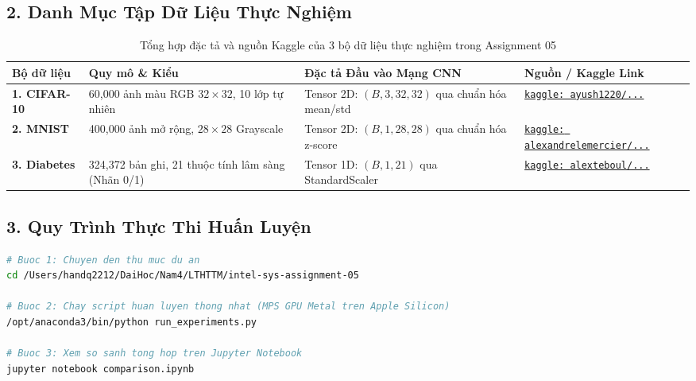 \documentclass[12pt,a4paper]{article}
\begin{document}
\subsection*{2. Danh Mục Tập Dữ Liệu Thực Nghiệm}
\begin{table}[htbp]
\centering
\small
\begin{tabularx}{\textwidth}{l L{3.2cm} X L{4.2cm}}
\toprule
\textbf{Bộ dữ liệu} & \textbf{Quy mô \& Kiểu} & \textbf{Đặc tả Đầu vào Mạng CNN} & \textbf{Nguồn / Kaggle Link} \\
\midrule
\textbf{1. CIFAR-10} & 60,000 ảnh màu RGB $32 \times 32$, 10 lớp tự nhiên & Tensor 2D: $(B, 3, 32, 32)$ qua chuẩn hóa mean/std & \href{https://www.kaggle.com/datasets/ayush1220/cifar10}{\texttt{kaggle: ayush1220/...}} \cite{data_cifar10} \\
\addlinespace
\textbf{2. MNIST} & 400,000 ảnh mở rộng, $28 \times 28$ Grayscale & Tensor 2D: $(B, 1, 28, 28)$ qua chuẩn hóa z-score & \href{https://www.kaggle.com/datasets/alexandrelemercier/400k-augmented-mnist-extended-handwritten-digits}{\texttt{kaggle: alexandrelemercier/...}} \cite{data_mnist} \\
\addlinespace
\textbf{3. Diabetes} & 324,372 bản ghi, 21 thuộc tính lâm sàng (Nhãn 0/1) & Tensor 1D: $(B, 1, 21)$ qua StandardScaler & \href{https://www.kaggle.com/datasets/alexteboul/diabetes-health-indicators-dataset}{\texttt{kaggle: alexteboul/...}} \cite{data_diabetes} \\
\bottomrule
\end{tabularx}
\caption{Tổng hợp đặc tả và nguồn Kaggle của 3 bộ dữ liệu thực nghiệm trong Assignment 05}
\label{tab:datasets_spec}
\end{table}

\subsection*{3. Quy Trình Thực Thi Huấn Luyện}
\begin{lstlisting}[language=bash, caption={Lệnh khởi chạy huấn luyện toàn diện 12 mô hình từ terminal}]
# Buoc 1: Chuyen den thu muc du an
cd /Users/handq2212/DaiHoc/Nam4/LTHTTM/intel-sys-assignment-05

# Buoc 2: Chay script huan luyen thong nhat (MPS GPU Metal tren Apple Silicon)
/opt/anaconda3/bin/python run_experiments.py

# Buoc 3: Xem so sanh tong hop tren Jupyter Notebook
jupyter notebook comparison.ipynb
\end{lstlisting}
\end{document}
